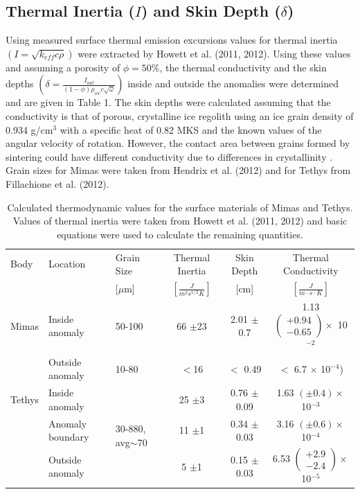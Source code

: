 \documentclass[11pt]{article} %
\begin{document}
\subsection{Thermal Inertia ($I$) and Skin Depth ($\delta$)}

		Using measured surface thermal emission excursions values for thermal inertia $\left( I = \sqrt{k_{eff}c\rho} \right)$ were extracted by Howett et al. (2011, 2012). Using these values and assuming a porosity of $\phi = 50\%$, the thermal conductivity and the skin depths $ \left( \delta = \frac{I_{out}}{(1-\phi)\rho_{ice} c \sqrt{\omega}} \right)$ inside and outside the anomalies were determined and are given in Table 1. The skin depths were calculated assuming that the conductivity is that of porous, crystalline ice regolith using an ice grain density of 0.934 g/cm$^{3}$ with a specific heat of 0.82 MKS and the known values of the angular velocity of rotation. However, the contact area between grains formed by sintering could have different conductivity due to differences in crystallinity . Grain sizes for Mimas were taken from Hendrix et al. (2012) and for Tethys from Fillachione et al. (2012). 
	
	\begin{table}[h]
		\centering
		\begin{tabular}[c]{ l | l | p{10pt} | c | c | c }
		Body & Location & Grain Size & Thermal Inertia & Skin Depth & Thermal Conductivity \\
		& & [$\mu$m] & $\left[ \frac{J}{m^{2} s^{1/2} K} \right]$ & [cm] & $\left[ \frac{J}{m\cdot s\cdot K} \right]$ \\ \hline
		Mimas & Inside anomaly & 50-100 & 66 $\pm$23 & 2.01 $\pm$0.7 & 1.13 $\left(\substack{+0.94 \\ -0.65} \right) \times$ 10$^{-2}$ \\
			& Outside anomaly & 10-80 & $<$16 & $<$ 0.49 & $<$ 6.7 $\times$ 10$^{-4}$) \\ \hline
		Tethys & Inside anomaly & \multirow{3}{*}{ 30-880, avg$\sim$70 } & 25 $\pm$3 & 0.76 $\pm$0.09 & 1.63 $(\pm 0.4) \times$ 10$^{-3}$ \\
			& Anomaly boundary & & 11 $\pm$1 & 0.34 $\pm$0.03 & 3.16 $(\pm 0.6) \times$ 10$^{-4}$ \\
			& Outside anomaly & & 5 $\pm$1 & 0.15 $\pm$0.03 & 6.53 $\left(\substack{+2.9 \\ -2.4} \right) \times$ 10$^{-5}$ \\
		\end{tabular}
		\caption{Calculated thermodynamic values for the surface materials of Mimas and Tethys. Values of thermal inertia were taken from Howett et al. (2011, 2012) and basic equations were used to calculate the remaining quantities.}
		\label{tab:therm}
	\end{table}
\end{document}
